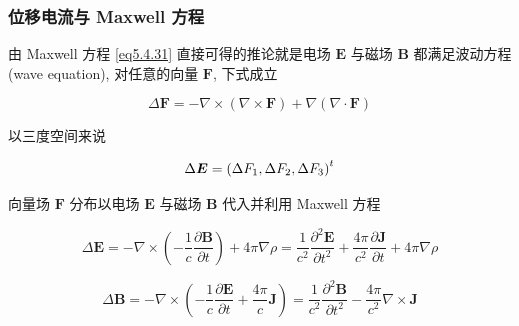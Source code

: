 \documentclass[aspectratio=2516]{beamer}
\begin{document}
\begin{frame}
\frametitle{\kaishu 位移电流与 Maxwell 方程}

\kaishu

\small

由 Maxwell 方程 \ref{eq5.4.31} 直接可得的推论就是电场 $ \boldsymbol{E} $ 与磁场 $ \boldsymbol{B} $ 都满足波动方程(wave equation), 对任意的向量 $ \boldsymbol{F} $, 下式成立

\begin{equation}
\Delta \boldsymbol{F} =  - \nabla  \times \left( {\nabla  \times \boldsymbol{F}} \right) + \nabla \left( {\nabla  \cdot \boldsymbol{F}} \right)
\label{eq5.4.32}
\end{equation}

以三度空间来说

\begin{equation}
\Delta \boldsymbol{E} = {\left( {\Delta {F_1},\Delta {F_2},\Delta {F_3}} \right)^t}
\notag 
\end{equation}

向量场 $ \boldsymbol{F} $ 分布以电场 $ \boldsymbol{E} $ 与磁场 $ \boldsymbol{B} $ 代入并利用 Maxwell 方程

\begin{equation}
\Delta \boldsymbol{E} =  - \nabla  \times \left( { - \frac{1}{c}\frac{{\partial \boldsymbol{B}}}{{\partial t}}} \right) + 4\pi \nabla \rho  = \frac{1}{{{c^2}}}\frac{{{\partial ^2}\boldsymbol{E}}}{{\partial {t^2}}} + \frac{{4\pi }}{{{c^2}}}\frac{{\partial \boldsymbol{J}}}{{\partial t}} + 4\pi \nabla \rho 
\label{eq5.4.33}
\end{equation}

\begin{equation}
\Delta \boldsymbol{B} =  - \nabla  \times \left( { - \frac{1}{c}\frac{{\partial \boldsymbol{E}}}{{\partial t}} + \frac{{4\pi }}{c}\boldsymbol{J}} \right) = \frac{1}{{{c^2}}}\frac{{{\partial ^2}\boldsymbol{B}}}{{\partial {t^2}}} - \frac{{4\pi }}{{{c^2}}}\nabla  \times \boldsymbol{J}
\label{eq5.4.34}
\end{equation}

 

\end{frame}

\end{document}
